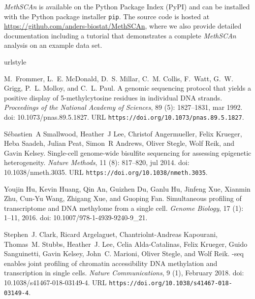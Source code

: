 \documentclass[10pt]{article}
\begin{document}
\textit{MethSCAn} is available on the Python Package Index (PyPI) and can be installed with the Python package installer \texttt{pip}.
The source code is hosted at \url{https://github.com/anders-biostat/MethSCAn}, where we also provide detailed documentation including a tutorial that demonstrates a complete \textit{MethSCAn} analysis on an example data set.


\begin{thebibliography}{31}
	\providecommand{\natexlab}[1]{#1}
	\providecommand{\url}[1]{\texttt{#1}}
	\expandafter\ifx\csname urlstyle\endcsname\relax
	\providecommand{\doi}[1]{doi: #1}\else
	\providecommand{\doi}{doi: \begingroup \urlstyle{rm}\Url}\fi
	
	M.~Frommer, L.~E. McDonald, D.~S. Millar, C.~M. Collis, F.~Watt, G.~W. Grigg,
	P.~L. Molloy, and C.~L. Paul.
	\newblock A genomic sequencing protocol that yields a positive display of
	5-methylcytosine residues in individual {DNA} strands.
	\newblock \emph{Proceedings of the National Academy of Sciences}, 89
	(5): 1827--1831, mar 1992.
	\newblock \doi{10.1073/pnas.89.5.1827}.
	\newblock URL \url{https://doi.org/10.1073/pnas.89.5.1827}.
	
	S{\'{e}}bastien~A Smallwood, Heather~J Lee, Christof Angermueller, Felix
	Krueger, Heba Saadeh, Julian Peat, Simon~R Andrews, Oliver Stegle, Wolf Reik,
	and Gavin Kelsey.
	\newblock Single-cell genome-wide bisulfite sequencing for assessing epigenetic
	heterogeneity.
	\newblock \emph{Nature Methods}, 11 (8): 817--820, jul 2014.
	\newblock \doi{10.1038/nmeth.3035}.
	\newblock URL \url{https://doi.org/10.1038/nmeth.3035}.
	
	Youjin Hu, Kevin Huang, Qin An, Guizhen Du, Ganlu Hu, Jinfeng Xue, Xianmin Zhu,
	Cun-Yu Wang, Zhigang Xue, and Guoping Fan.
	\newblock Simultaneous profiling of transcriptome and {DNA} methylome from a
	single cell.
	\newblock \emph{Genome Biology}, 17 (1): 1--11, 2016.
	\newblock \doi{10.1007/978-1-4939-9240-9_21}.
	
	Stephen~J. Clark, Ricard Argelaguet, Chantriolnt-Andreas Kapourani, Thomas~M.
	Stubbs, Heather~J. Lee, Celia Alda-Catalinas, Felix Krueger, Guido
	Sanguinetti, Gavin Kelsey, John~C. Marioni, Oliver Stegle, and Wolf Reik.
	-seq enables joint profiling of chromatin accessibility {DNA}
	methylation and transcription in single cells.
	\newblock \emph{Nature Communications}, 9 (1), February 2018.
	\newblock \doi{10.1038/s41467-018-03149-4}.
	\newblock URL \url{https://doi.org/10.1038/s41467-018-03149-4}.
	

\end{thebibliography}
\end{document}
